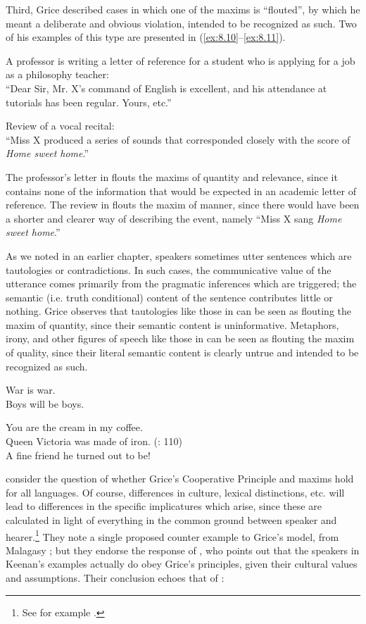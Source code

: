Third, Grice described cases in which one of the maxims is “flouted”, by which he meant a deliberate and obvious violation, intended to be recognized as such. Two of his examples of this type are presented in (\ref{ex:8.10}--\ref{ex:8.11}).


\ea \label{ex:8.10}
A professor is writing a letter of reference for a student who is applying for a job as a philosophy teacher:\\
“Dear Sir, Mr. X’s command of English is excellent, and his attendance at tutorials has been regular. Yours, etc.”
\z

\ea \label{ex:8.11}
Review of a vocal recital:\\
“Miss X produced a series of sounds that corresponded closely with the score of \textit{Home sweet home}.”
\z


The professor’s letter in  flouts the maxims of quantity and relevance, since it contains none of the information that would be expected in an academic letter of reference. The review in  flouts the maxim of manner, since there would have been a shorter and clearer way of describing the event, namely “Miss X sang \textit{Home sweet home}.”



As we noted in an earlier chapter, speakers sometimes utter sentences which are tautologies or contradictions. In such cases, the communicative value of the utterance comes primarily from the pragmatic inferences which are triggered; the semantic (i.e. truth conditional) content of the sentence contributes little or nothing. Grice observes that tautologies like those in  can be seen as flouting the maxim of quantity, since their semantic content is uninformative. Metaphors, irony, and other figures of speech like those in  can be seen as flouting the maxim of quality, since their literal semantic content is clearly untrue and intended to be recognized as such.


\ea \label{ex:8.12}
\ea War is war.\\
\ex Boys will be boys.
                       \z
\z

\ea \label{ex:8.13}
\ea You are the cream in my coffee.\\
\ex Queen Victoria was made of iron. (\citealt{Levinson1983}: 110)\\
\ex A fine friend he turned out to be!
                       \z
\z


 consider the question of whether Grice’s Cooperative Principle and maxims hold for all languages. Of course, differences in culture, lexical distinctions, etc. will lead to differences in the specific implicatures which arise, since these are calculated in light of everything in the common ground between speaker and hearer.\footnote{See for example \citet{Matsumoto1995}.} They note a single proposed counter example to Grice’s model, from Malagasy \citep{Keenan1974}; but they endorse the response of \citet{Prince1982}, who points out that the speakers in Keenan’s examples actually do obey Grice’s principles, given their cultural values and assumptions. Their conclusion echoes that of \citet[419]{Green1990}:


